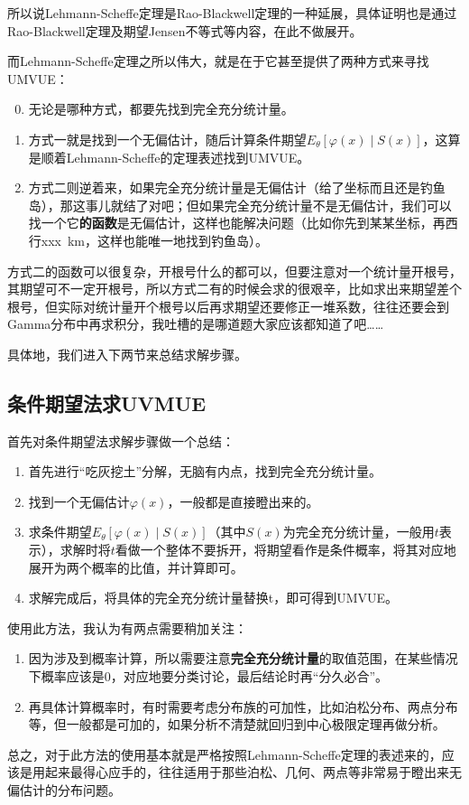 \documentclass[10pt, a4paper]{article}
\begin{document}
所以说Lehmann-Scheffe定理是Rao-Blackwell定理的一种延展，具体证明也是通过Rao-Blackwell定理及期望Jensen不等式等内容，在此不做展开。\par
而Lehmann-Scheffe定理之所以伟大，就是在于它甚至提供了两种方式来寻找UMVUE：
\begin{enumerate}
    \setcounter{enumi}{-1} 
    \item 无论是哪种方式，都要先找到完全充分统计量。
    \item 方式一就是找到一个无偏估计，随后计算条件期望$E_\theta [\varphi(x) \mid S(x)]$，这算是顺着Lehmann-Scheffe的定理表述找到UMVUE。
    \item 方式二则逆着来，如果完全充分统计量是无偏估计（给了坐标而且还是钓鱼岛），那这事儿就结了对吧；但如果完全充分统计量不是无偏估计，我们可以找一个它\textbf{的函数}是无偏估计，这样也能解决问题（比如你先到某某坐标，再西行xxx~km，这样也能唯一地找到钓鱼岛）。
\end{enumerate} \par
方式二的函数可以很复杂，开根号什么的都可以，但要注意对一个统计量开根号，其期望可不一定开根号，所以方式二有的时候会求的很艰辛，比如求出来期望差个根号，但实际对统计量开个根号以后再求期望还要修正一堆系数，往往还要会到Gamma分布中再求积分，我吐槽的是哪道题大家应该都知道了吧……\par
具体地，我们进入下两节来总结求解步骤。

\subsection{条件期望法求UVMUE}
首先对条件期望法求解步骤做一个总结：
\begin{enumerate}
    \item 首先进行“吃灰挖土”分解，无脑有内点，找到完全充分统计量。
    \item 找到一个无偏估计$\varphi(x)$，一般都是直接瞪出来的。
    \item 求条件期望$E_\theta [\varphi(x) \mid S(x)]$（其中$S(x)$为完全充分统计量，一般用$t$表示），求解时将$t$看做一个整体不要拆开，将期望看作是条件概率，将其对应地展开为两个概率的比值，并计算即可。
    \item 求解完成后，将具体的完全充分统计量替换t，即可得到UMVUE。
\end{enumerate} \par
使用此方法，我认为有两点需要稍加关注：
\begin{enumerate}
    \item 因为涉及到概率计算，所以需要注意\textbf{完全充分统计量}的取值范围，在某些情况下概率应该是0，对应地要分类讨论，最后结论时再“分久必合”。
    \item 再具体计算概率时，有时需要考虑分布族的可加性，比如泊松分布、两点分布等，但一般都是可加的，如果分析不清楚就回归到中心极限定理再做分析。
\end{enumerate} \par
总之，对于此方法的使用基本就是严格按照Lehmann-Scheffe定理的表述来的，应该是用起来最得心应手的，往往适用于那些泊松、几何、两点等非常易于瞪出来无偏估计的分布问题。
\end{document}
